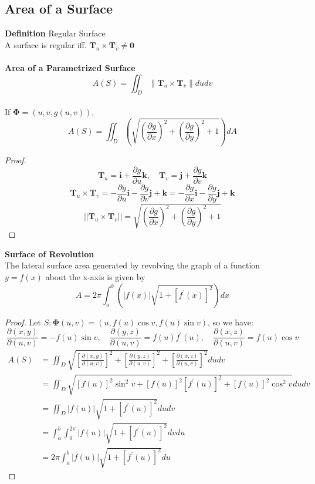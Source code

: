 \documentclass[11pt]{article}
\begin{document}
\subsection{Area of a Surface}
\textbf{Definition} Regular Surface\\
A surface is regular iff. $\mathbf{T}_{u} \times \mathbf{T}_{v} \ne \mathbf{0}$\\\\
\textbf{Area of a Parametrized Surface}
\[A(S)=\iint_{D}\left\|\mathbf{T}_{u} \times \mathbf{T}_{v}\right\| d u dv\]
\\
If $\mathbf{\Phi} = (u,v,g(u,v))$,
\[A(S)=\iint_{D}\left(\sqrt{\left(\frac{\partial g}{\partial x}\right)^{2}+\left(\frac{\partial g}{\partial y}\right)^{2}+1}\right) d A\]
\begin{proof}
    \[\mathbf{T}_{u}=\mathbf{i}+\frac{\partial g}{\partial u} \mathbf{k}, \quad \mathbf{T}_{v}=\mathbf{j}+\frac{\partial g}{\partial v} \mathbf{k}
    \]\[
    \mathbf{T}_{u} \times \mathbf{T}_{v}=-\frac{\partial g}{\partial u} \mathbf{i}-\frac{\partial g}{\partial v} \mathbf{j}+\mathbf{k}=-\frac{\partial g}{\partial x} \mathbf{i}-\frac{\partial g}{\partial y} \mathbf{j}+\mathbf{k}
    \]
    \[||\mathbf{T}_{u} \times \mathbf{T}_{v}|| = \sqrt{\left(\frac{\partial g}{\partial x}\right)^{2}+\left(\frac{\partial g}{\partial y}\right)^{2}+1}\]
\end{proof}

\textbf{Surface of Revolution}\\
The lateral surface area generated by revolving the graph of a function $y = f (x)$ about the x-axis is given by
\[A=2 \pi \int_{a}^{b}\left(|f(x)| \sqrt{1+\left[f^{\prime}(x)\right]^{2}}\right) d x\]
\begin{proof}
    Let $S: \mathbf{\Phi}(u,v) = (u, f(u) \cos v, f(u) \sin v)$, so we have:
    \[\frac{\partial(x, y)}{\partial(u, v)}=-f(u) \sin v, \quad \frac{\partial(y, z)}{\partial(u, v)}=f(u) f^{\prime}(u), \quad \frac{\partial(x, z)}{\partial(u, v)}=f(u) \cos v\]
    \[\begin{aligned}
        A(S) &=\iint_{D} \sqrt{\left[\frac{\partial(x, y)}{\partial(u, v)}\right]^{2}+\left[\frac{\partial(y, z)}{\partial(u, v)}\right]^{2}+\left[\frac{\partial(x, z)}{\partial(u, v)}\right]^{2}} d u d v \\
        &=\iint_{D} \sqrt{[f(u)]^{2} \sin ^{2} v+[f(u)]^{2}\left[f^{\prime}(u)\right]^{2}+[f(u)]^{2} \cos ^{2} v} d u d v \\
        &=\iint_{D}|f(u)| \sqrt{1+\left[f^{\prime}(u)\right]^{2}} d u d v \\
        &=\int_{a}^{b} \int_{0}^{2 \pi}|f(u)| \sqrt{1+\left[f^{\prime}(u)\right]^{2}} d v d u \\
        &=2 \pi \int_{a}^{b}|f(u)| \sqrt{1+\left[f^{\prime}(u)\right]^{2}} d u
        \end{aligned}\]
\end{proof}
\end{document}
